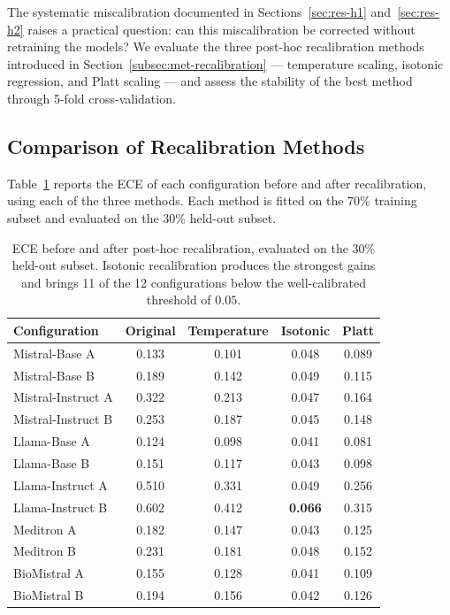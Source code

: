 The systematic miscalibration documented in Sections~\ref{sec:res-h1} 
and~\ref{sec:res-h2} raises a practical question: can this miscalibration 
be corrected without retraining the models? We evaluate the three 
post-hoc recalibration methods introduced in 
Section~\ref{subsec:met-recalibration} --- temperature scaling, isotonic 
regression, and Platt scaling --- and assess the stability of the best 
method through 5-fold cross-validation.

\subsection{Comparison of Recalibration Methods}
\label{subsec:res-recalibration-comparison}

Table~\ref{tab:res-recalibration} reports the ECE of each configuration 
before and after recalibration, using each of the three methods. Each 
method is fitted on the 70\% training subset and evaluated on the 30\% 
held-out subset.

\begin{table}[htbp]
    \centering
    \caption{ECE before and after post-hoc recalibration, evaluated on 
        the 30\% held-out subset. Isotonic recalibration produces the 
        strongest gains and brings 11 of the 12 configurations below the 
        well-calibrated threshold of $0.05$.}
    \label{tab:res-recalibration}
    \small
    \begin{tabular}{@{}lcccc@{}}
        \toprule
        \textbf{Configuration} & 
        \textbf{Original} & 
        \textbf{Temperature} & 
        \textbf{Isotonic} & 
        \textbf{Platt} \\
        \midrule
        Mistral-Base A     & 0.133 & 0.101 & 0.048 & 0.089 \\
        Mistral-Base B     & 0.189 & 0.142 & 0.049 & 0.115 \\
        Mistral-Instruct A & 0.322 & 0.213 & 0.047 & 0.164 \\
        Mistral-Instruct B & 0.253 & 0.187 & 0.045 & 0.148 \\
        Llama-Base A       & 0.124 & 0.098 & 0.041 & 0.081 \\
        Llama-Base B       & 0.151 & 0.117 & 0.043 & 0.098 \\
        Llama-Instruct A   & 0.510 & 0.331 & 0.049 & 0.256 \\
        Llama-Instruct B   & 0.602 & 0.412 & \textbf{0.066} & 0.315 \\
        Meditron A         & 0.182 & 0.147 & 0.043 & 0.125 \\
        Meditron B         & 0.231 & 0.181 & 0.048 & 0.152 \\
        BioMistral A       & 0.155 & 0.128 & 0.041 & 0.109 \\
        BioMistral B       & 0.194 & 0.156 & 0.042 & 0.126 \\
        \bottomrule
    \end{tabular}
\end{table}

